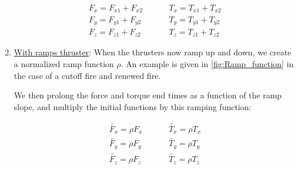 \begin{enumerate}
\begin{align}
F_x = F_{x1} + F_{x2} &\hspace{1cm} T_x = T_{x1} + T_{x2} \\ 
F_y =  F_{y1} + F_{y2} &\hspace{1cm} T_y =  T_{y1} + T_{y2}\\ 
F_z =  F_{z1} + F_{z2} &\hspace{1cm} T_z =  T_{z1} + T_{z2}
\end{align}

\item{\underline{With ramps thruster}}: When the thrusters now ramp up and down, we create a normalized ramp function $\rho$. An example is given in \ref{fig:Ramp_function} in the case of a cutoff fire and renewed fire. \par

 

We then prolong the force and torque end times as a function of the ramp slope, and multiply the initial functions by this ramping function:

\begin{align}
\tilde{F_x} = \rho F_{x} &\hspace{1cm} \tilde{T_x} =\rho T_{x}  \\ 
\tilde{F_y} =  \rho F_{y}  &\hspace{1cm} \tilde{T_y} =\rho  T_{y} \\ 
\tilde{F_z} = \rho F_{z} &\hspace{1cm} \tilde{T_z} =\rho  T_{z} 
\end{align}

\end{enumerate}